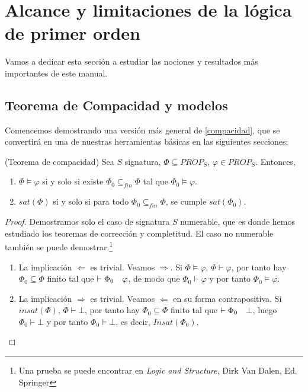 \chapter{Alcance y limitaciones de la lógica de primer orden}


Vamos a dedicar esta sección a estudiar las nociones y resultados más importantes de este manual.


\section{Teorema de Compacidad y modelos}

Comencemos demostrando una versión más general de \ref{compacidad}, que se convertirá en una de nuestras herramientas básicas en las siguientes secciones: 

\begin{theorem}\label{comp2} (Teorema de compacidad)
Sea $S$ signatura, $\Phi\subseteq PROP_S$, $\varphi\in PROP_S$. Entonces,
\begin{enumerate}[label=\alph*)]
    \item $\Phi\vDash\varphi$ si y solo si existe $\Phi_0\subseteq_{fin}\Phi$ tal que $\Phi_0\vDash\varphi$.
    \item $sat(\Phi)$ si y solo si para todo $\Phi_0\subseteq_{fin}\Phi$, se cumple $sat(\Phi_0)$.
\end{enumerate}
\end{theorem}

\begin{proof}
Demostramos solo el caso de signatura $S$ numerable, que es donde hemos estudiado los teoremas de corrección y completitud. El caso no numerable también se puede demostrar.\footnote{Una prueba se puede encontrar en \textit{Logic and Structure}, Dirk Van Dalen, Ed. Springer}
\begin{enumerate}[label=\alph*)]

\item  La implicación $\Longleftarrow$ es trivial. Veamos $\Longrightarrow$. Si $\Phi\vDash\varphi$, $\Phi\vdash\varphi$, por tanto hay $\Phi_0\subseteq\Phi$ finito tal que $\vdash\Phi_0\quad\varphi$, de modo que $\Phi_0\vdash\varphi$ y por tanto $\Phi_0\vDash\varphi$.

\item  La implicación $\Longrightarrow$ es trivial. Veamos $\Longleftarrow$ en su forma contrapositiva. Si $insat(\Phi)$, $\Phi\vdash\bot$, por tanto hay $\Phi_0\subseteq\Phi$ finito tal que $\vdash\Phi_0\quad\bot$, luego $\Phi_0\vdash\bot$ y por tanto $\Phi_0\vDash\bot$, es decir, $Insat(\Phi_0)$.
\end{enumerate}
\end{proof}




